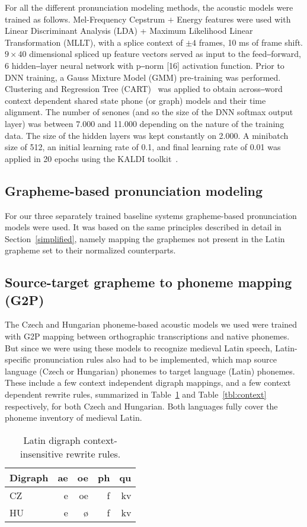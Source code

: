 \documentclass[runningheads,a4paper]{llncs}
\begin{document}
For all the different pronunciation modeling methods, the acoustic models were trained as follows.
Mel-Frequency Cepstrum $+$ Energy features were used with Linear Discriminant Analysis (LDA) + Maximum Likelihood Linear Transformation (MLLT), with a splice context of $\pm4$ frames, 10 ms of frame shift.
$9\times40$ dimensional spliced up feature vectors served as input to the feed‒forward, 6 hidden‒layer neural network with p‒norm [16] activation function.
Prior to DNN training, a Gauss Mixture Model (GMM) pre-training was performed.
Clustering and Regression Tree (CART)~\cite{kaldi} was applied to obtain across‒word context dependent shared state phone (or graph) models and their time alignment.
The number of senones (and so the size of the DNN softmax output layer) was between 7.000 and 11.000 depending on the nature of the training data.
The size of the hidden layers was kept constantly on 2.000.
A minibatch size of 512, an initial learning rate of 0.1, and final learning rate of 0.01 was applied in 20 epochs using the KALDI toolkit~\cite{kaldi}.
\subsection{Grapheme-based pronunciation modeling}\label{baseline}
For our three separately trained baseline systems grapheme-based pronunciation models were used.
It was based on the same principles described in detail in Section~\ref{simplified}, namely mapping the graphemes not present in the Latin grapheme set to their normalized counterparts.
\subsection{Source-target grapheme to phoneme mapping (G2P)}\label{g2p}
The Czech and Hungarian phoneme-based acoustic models we used were trained with G2P mapping between orthographic transcriptions and native phonemes.
But since we were using these models to recognize medieval Latin speech, Latin-specific pronunciation rules also had to be implemented, which map source language (Czech or Hungarian) phonemes to target language (Latin) phonemes.
These include a few context independent digraph mappings, and a few context dependent rewrite rules, summarized in Table~\ref{tbl:digraph} and Table~\ref{tbl:context} respectively, for both Czech and Hungarian.
Both languages fully cover the phoneme inventory of medieval Latin.

\begin{table}\label{tbl:digraph}
	\centering
	\caption{Latin digraph context-insensitive rewrite rules.}
	\begin{tabular}{l|rrrr}
	\hline
	Digraph & ae & oe & ph & qu \\
	\hline
	CZ & e & oe & f & kv \\
	HU & e & \o & f & kv \\
	\hline
	\end{tabular}
\end{table}
\end{document}
